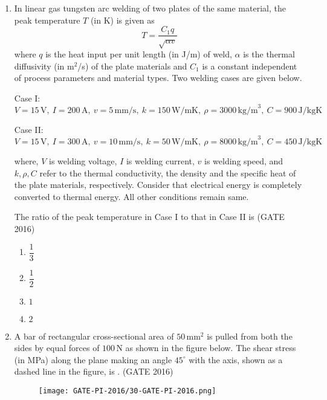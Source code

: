 \documentclass[journal,12pt,onecolumn]{IEEEtran}
\theoremstyle{remark}
\begin{document}
\begin{enumerate}
\vspace{0.5cm}

\item In linear gas tungsten arc welding of two plates of the same material, 
the peak temperature $T$ (in K) is given as  
\[
T = \frac{C_1 q}{\sqrt{\alpha v}}
\]  
where $q$ is the heat input per unit length (in J/m) of weld, $\alpha$ is the thermal diffusivity (in m$^2$/s) of the plate materials and $C_1$ is a constant independent of process parameters and material types. Two welding cases are given below.  

Case I: $V = 15 \, \text{V}, \ I = 200 \, \text{A}, \ v = 5 \, \text{mm/s}, \ k = 150 \, \text{W/mK}, \ \rho = 3000 \, \text{kg/m}^3, \ C = 900 \, \text{J/kgK}$  

Case II: $V = 15 \, \text{V}, \ I = 300 \, \text{A}, \ v = 10 \, \text{mm/s}, \ k = 50 \, \text{W/mK}, \ \rho = 8000 \, \text{kg/m}^3, \ C = 450 \, \text{J/kgK}$  

where, $V$ is welding voltage, $I$ is welding current, $v$ is welding speed, and $k, \rho, C$ refer to the thermal conductivity, the density and the specific heat of the plate materials, respectively. Consider that electrical energy is completely converted to thermal energy. All other conditions remain same.  

The ratio of the peak temperature in Case I to that in Case II is  \hfill{(GATE 2016)}

\begin{multicols}{2}
\begin{enumerate}
    \item $\dfrac{1}{3}$
    \item $\dfrac{1}{2}$
    \item $1$
    \item $2$
\end{enumerate}
\end{multicols}

\vspace{0.5cm}

\item A bar of rectangular cross-sectional area of $50 \, \text{mm}^2$ is pulled from both the sides by equal forces of $100 \, \text{N}$ as shown in the figure below.  
The shear stress (in MPa) along the plane making an angle $45^\circ$ with the axis, shown as a dashed line in the figure, is \underline{\hspace{2cm}}. \hfill{(GATE 2016)} 

\begin{figure}[h!]
    \centering
    \texttt{[image: GATE-PI-2016/30-GATE-PI-2016.png]}
    \caption{}
    \label{q30}
\end{figure}


\end{enumerate}
\end{document}
